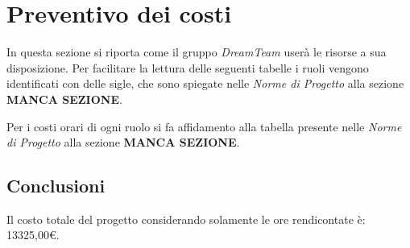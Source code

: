 \section{Preventivo dei costi}
In questa sezione si riporta come il gruppo \textit{DreamTeam} userà le risorse a sua disposizione.  Per facilitare la lettura delle seguenti tabelle i ruoli vengono identificati con delle sigle,  che sono spiegate nelle \textit{Norme di Progetto} alla sezione \textbf{MANCA SEZIONE}.

Per i costi orari di ogni ruolo si fa affidamento alla tabella presente nelle \textit{Norme di Progetto} alla sezione \textbf{MANCA SEZIONE}.


\pagebreak

\pagebreak

\pagebreak

\pagebreak


\subsection{Conclusioni}
Il costo totale del progetto considerando solamente le ore rendicontate è:  13325,00\euro .

\pagebreak